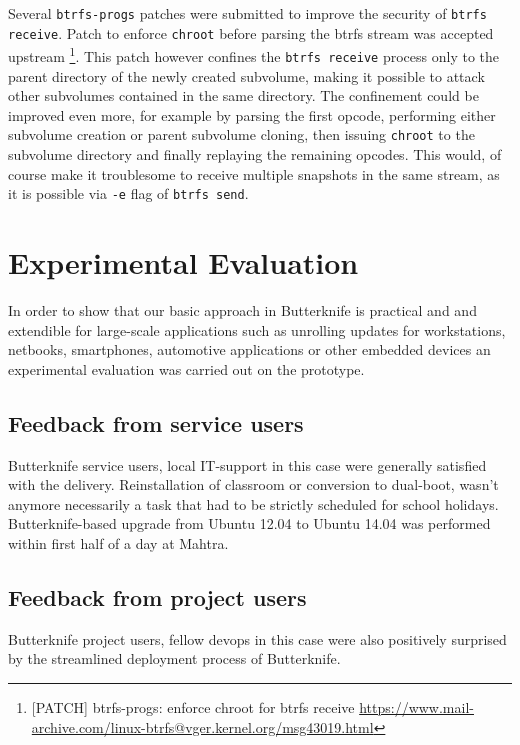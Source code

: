 \documentclass[a4paper,11pt]{kth-mag}
\begin{document}
Several \lstinline!btrfs-progs! patches were submitted to improve
the security of \lstinline!btrfs receive!.
Patch to enforce \lstinline!chroot!
before parsing the \acrshort{btrfs} stream was accepted upstream
\footnote{
[PATCH] btrfs-progs: enforce chroot for btrfs receive
\url{https://www.mail-archive.com/linux-btrfs@vger.kernel.org/msg43019.html}}.
This patch however confines the \lstinline!btrfs receive!
process only to the parent directory of the newly created subvolume,
making it possible to attack other subvolumes contained in the same directory.
The confinement could be improved even more, for example
by parsing the first opcode, performing either
subvolume creation or parent subvolume cloning,
then issuing \lstinline!chroot! to the subvolume directory
and finally replaying the remaining opcodes.
This would, of course make it troublesome to receive multiple
snapshots in the same stream, as it is possible via \lstinline!-e!
flag of \lstinline!btrfs send!.



%
%
%
%
\chapter{Experimental Evaluation}
\label{chap:evaluation}
In order to show that our basic approach in Butterknife is practical and
and extendible for large-scale applications such as unrolling
updates for workstations, netbooks, smartphones,
automotive applications or other embedded devices
an experimental evaluation was carried out on the prototype.

\section{Feedback from service users}

Butterknife service users, local IT-support in this case
were generally satisfied with the delivery.
Reinstallation of classroom or conversion to dual-boot,
wasn't anymore necessarily a task that had to
be strictly scheduled for school holidays.
Butterknife-based upgrade from Ubuntu 12.04 to
Ubuntu 14.04 was performed within first
half of a day at Mahtra.

\section{Feedback from project users}

Butterknife project users, fellow devops in this case
were also positively surprised by the
streamlined deployment process of Butterknife.
\end{document}
